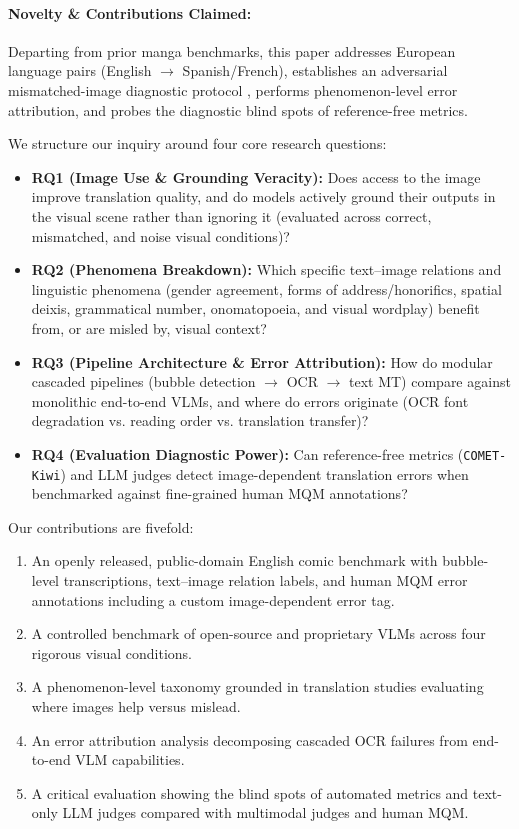 \documentclass[11pt,a4paper]{article}
\begin{document}
\paragraph{Novelty \& Contributions Claimed:}
Departing from prior manga benchmarks, this paper addresses European language pairs (English $\to$ Spanish/French), establishes an adversarial mismatched-image diagnostic protocol \cite{elliott2018adversarial}, performs phenomenon-level error attribution, and probes the diagnostic blind spots of reference-free metrics.

We structure our inquiry around four core research questions:
\begin{itemize}[leftmargin=*,noitemsep]
    \item \textbf{RQ1 (Image Use \& Grounding Veracity):} Does access to the image improve translation quality, and do models actively ground their outputs in the visual scene rather than ignoring it (evaluated across correct, mismatched, and noise visual conditions)?
    \item \textbf{RQ2 (Phenomena Breakdown):} Which specific text--image relations and linguistic phenomena (gender agreement, forms of address/honorifics, spatial deixis, grammatical number, onomatopoeia, and visual wordplay) benefit from, or are misled by, visual context?
    \item \textbf{RQ3 (Pipeline Architecture \& Error Attribution):} How do modular cascaded pipelines (bubble detection $\to$ OCR $\to$ text MT) compare against monolithic end-to-end VLMs, and where do errors originate (OCR font degradation vs. reading order vs. translation transfer)?
    \item \textbf{RQ4 (Evaluation Diagnostic Power):} Can reference-free metrics (\texttt{COMET-Kiwi}) and LLM judges detect image-dependent translation errors when benchmarked against fine-grained human MQM annotations?
\end{itemize}

\noindent Our contributions are fivefold:
\begin{enumerate}[leftmargin=*,noitemsep]
    \item An openly released, public-domain English comic benchmark with bubble-level transcriptions, text--image relation labels, and human MQM error annotations including a custom image-dependent error tag.
    \item A controlled benchmark of open-source and proprietary VLMs across four rigorous visual conditions.
    \item A phenomenon-level taxonomy grounded in translation studies evaluating where images help versus mislead.
    \item An error attribution analysis decomposing cascaded OCR failures from end-to-end VLM capabilities.
    \item A critical evaluation showing the blind spots of automated metrics and text-only LLM judges compared with multimodal judges and human MQM.
\end{enumerate}
\end{document}
